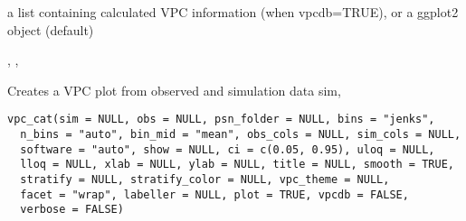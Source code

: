 \documentclass[letterpaper]{book}
\begin{document}
%
\begin{Value}
a list containing calculated VPC information (when vpcdb=TRUE), or a ggplot2 object (default)
\end{Value}
%
\begin{SeeAlso}\relax
{}, , 
\end{SeeAlso}
%
\begin{Description}\relax
Creates a VPC plot from observed and simulation data
sim,
\end{Description}
%
\begin{Usage}
\begin{verbatim}
vpc_cat(sim = NULL, obs = NULL, psn_folder = NULL, bins = "jenks",
  n_bins = "auto", bin_mid = "mean", obs_cols = NULL, sim_cols = NULL,
  software = "auto", show = NULL, ci = c(0.05, 0.95), uloq = NULL,
  lloq = NULL, xlab = NULL, ylab = NULL, title = NULL, smooth = TRUE,
  stratify = NULL, stratify_color = NULL, vpc_theme = NULL,
  facet = "wrap", labeller = NULL, plot = TRUE, vpcdb = FALSE,
  verbose = FALSE)
\end{verbatim}
\end{Usage}
%
\end{document}

